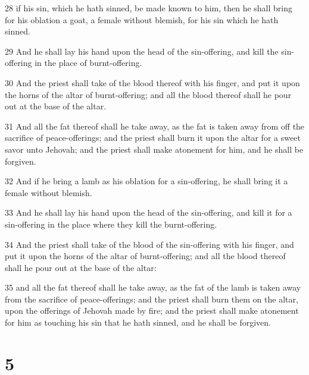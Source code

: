 \par 28 if his sin, which he hath sinned, be made known to him, then he shall bring for his oblation a goat, a female without blemish, for his sin which he hath sinned.
\par 29 And he shall lay his hand upon the head of the sin-offering, and kill the sin-offering in the place of burnt-offering.
\par 30 And the priest shall take of the blood thereof with his finger, and put it upon the horns of the altar of burnt-offering; and all the blood thereof shall he pour out at the base of the altar.
\par 31 And all the fat thereof shall he take away, as the fat is taken away from off the sacrifice of peace-offerings; and the priest shall burn it upon the altar for a sweet savor unto Jehovah; and the priest shall make atonement for him, and he shall be forgiven.
\par 32 And if he bring a lamb as his oblation for a sin-offering, he shall bring it a female without blemish.
\par 33 And he shall lay his hand upon the head of the sin-offering, and kill it for a sin-offering in the place where they kill the burnt-offering.
\par 34 And the priest shall take of the blood of the sin-offering with his finger, and put it upon the horns of the altar of burnt-offering; and all the blood thereof shall he pour out at the base of the altar:
\par 35 and all the fat thereof shall he take away, as the fat of the lamb is taken away from the sacrifice of peace-offerings; and the priest shall burn them on the altar, upon the offerings of Jehovah made by fire; and the priest shall make atonement for him as touching his sin that he hath sinned, and he shall be forgiven.

\chapter{5}

